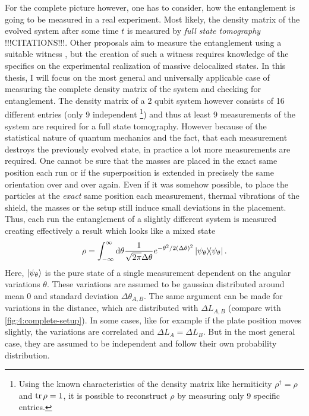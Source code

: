 For the complete picture however, one has to consider, how the entanglement is going to be measured in a real experiment.
Most likely, the density matrix of the evolved system after some time $t$ is measured by \emph{full state tomography} !!!CITATIONS!!!. Other proposals aim to measure the entanglement using a suitable witness \cite{Bose_2017,Chevalier_2020}, but the creation of such a witness requires knowledge of the specifics on the experimental realization of massive delocalized states.
In this thesis, I will focus on the most general and universally applicable case of measuring the complete density matrix of the system and checking for entanglement.
The density matrix of a 2 qubit system however consists of 16 different entries (only 9 independent \footnote{Using the known characteristics of the density matrix like hermiticity $\rho^\dagger = \rho$ and $\tr \rho = 1$, it is possible to reconstruct $\rho$ by measuring only 9 specific entries.}) and thus at least 9 measurements of the system are required for a full state tomography. However because of the statistical nature of quantum mechanics and the fact, that each measurement destroys the previously evolved state, in practice a lot more measurements are required.
One cannot be sure that the masses are placed in the exact same position each run or if the superposition is extended in precisely the same orientation over and over again. Even if it was somehow possible, to place the particles at the \textit{exact} same position each measurement, thermal vibrations of the shield, the masses or the setup still induce small deviations in the placement.
Thus, each run the entanglement of a slightly different system is measured creating effectively a result which looks like a mixed state
\begin{equation}
  \rho = \int_{-\infty}^{\infty} \dd \theta \frac{1}{\sqrt{2\pi}\Delta \theta} e^{-\theta^2/2(\Delta \theta)^2} \ketbra{\psi_\theta} .
\end{equation}
Here, $\ket{\psi_\theta}$ is the pure state of a single measurement dependent on the angular variations $\theta$. These variations are assumed to be gaussian distributed around mean $0$ and standard deviation $\Delta \theta_{A,B}$.
The same argument can be made for variations in the distance, which are distributed with $\Delta L_{A,B}$ (compare with \cref{fig:4:complete-setup}).
In some cases, like for example if the plate position moves slightly, the variations are correlated and $\Delta L_A = \Delta L_B$. But in the most general case, they are assumed to be independent and follow their own probability distribution.

